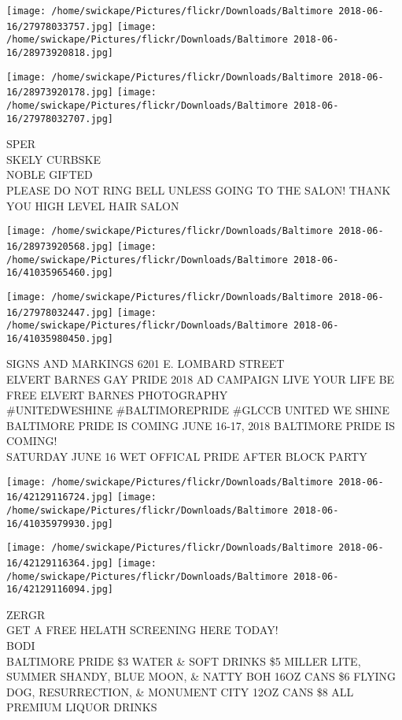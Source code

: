 \documentclass[10pt,letterpaper]{article}
\begin{document}
\texttt{[image: /home/swickape/Pictures/flickr/Downloads/Baltimore 2018-06-16/27978033757.jpg]}
\texttt{[image: /home/swickape/Pictures/flickr/Downloads/Baltimore 2018-06-16/28973920818.jpg]}

\texttt{[image: /home/swickape/Pictures/flickr/Downloads/Baltimore 2018-06-16/28973920178.jpg]}
\texttt{[image: /home/swickape/Pictures/flickr/Downloads/Baltimore 2018-06-16/27978032707.jpg]}

SPER\\
SKELY CURBSKE\\
NOBLE GIFTED\\
PLEASE DO NOT RING BELL UNLESS GOING TO THE SALON!  THANK YOU  HIGH LEVEL HAIR SALON\\
\pagebreak

\texttt{[image: /home/swickape/Pictures/flickr/Downloads/Baltimore 2018-06-16/28973920568.jpg]}
\texttt{[image: /home/swickape/Pictures/flickr/Downloads/Baltimore 2018-06-16/41035965460.jpg]}

\texttt{[image: /home/swickape/Pictures/flickr/Downloads/Baltimore 2018-06-16/27978032447.jpg]}
\texttt{[image: /home/swickape/Pictures/flickr/Downloads/Baltimore 2018-06-16/41035980450.jpg]}

SIGNS AND MARKINGS 6201 E. LOMBARD STREET\\
ELVERT BARNES GAY PRIDE 2018 AD CAMPAIGN LIVE YOUR LIFE BE FREE ELVERT BARNES PHOTOGRAPHY\\
\#UNITEDWESHINE \#BALTIMOREPRIDE \#GLCCB UNITED WE SHINE BALTIMORE PRIDE IS COMING JUNE 16{-}17, 2018 BALTIMORE PRIDE IS COMING!\\
SATURDAY JUNE 16 WET OFFICAL PRIDE AFTER BLOCK PARTY\\
\pagebreak

\texttt{[image: /home/swickape/Pictures/flickr/Downloads/Baltimore 2018-06-16/42129116724.jpg]}
\texttt{[image: /home/swickape/Pictures/flickr/Downloads/Baltimore 2018-06-16/41035979930.jpg]}

\texttt{[image: /home/swickape/Pictures/flickr/Downloads/Baltimore 2018-06-16/42129116364.jpg]}
\texttt{[image: /home/swickape/Pictures/flickr/Downloads/Baltimore 2018-06-16/42129116094.jpg]}

ZERGR\\
GET A FREE HELATH SCREENING HERE TODAY!\\
BODI\\
BALTIMORE PRIDE \$3 WATER \& SOFT DRINKS \$5 MILLER LITE, SUMMER SHANDY, BLUE MOON, \& NATTY BOH 16OZ CANS \$6 FLYING DOG, RESURRECTION, \& MONUMENT CITY 12OZ CANS \$8 ALL PREMIUM LIQUOR DRINKS\\
\pagebreak
\end{document}
